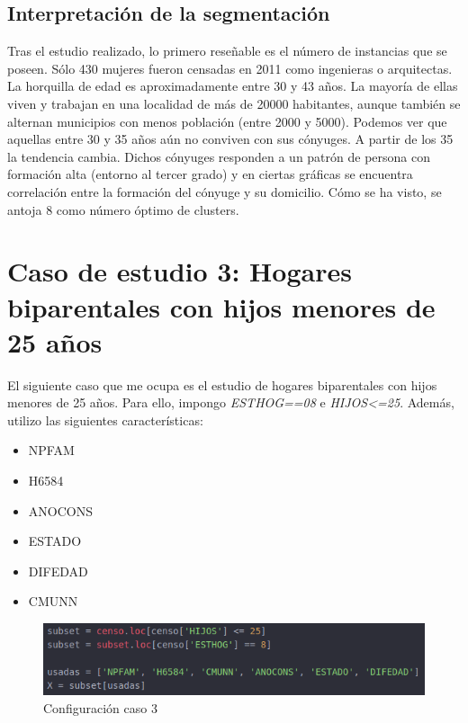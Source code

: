 \subsection{Interpretación de la segmentación}

Tras el estudio realizado, lo primero reseñable es el número de instancias que se poseen. Sólo 430 mujeres fueron censadas en 2011 como ingenieras o arquitectas. La horquilla de edad es aproximadamente entre 30 y 43 años. La mayoría de ellas viven y trabajan en una localidad de más de 20000 habitantes, aunque también se alternan municipios con menos población (entre 2000 y 5000). Podemos ver que aquellas entre 30 y 35 años aún no conviven con sus cónyuges. A partir de los 35 la tendencia cambia. Dichos cónyuges responden a un patrón de persona con formación alta (entorno al tercer grado) y en ciertas gráficas se encuentra correlación entre la formación del cónyuge y su domicilio. Cómo se ha visto, se antoja 8 como número óptimo de clusters. 

\newpage

\section{Caso de estudio 3: Hogares biparentales con hijos menores de 25 años}

El siguiente caso que me ocupa es el estudio de hogares biparentales con hijos menores de 25 años. Para ello, impongo \textit{ESTHOG==08} e \textit{HIJOS<=25}. Además, utilizo las siguientes características:

\begin{itemize}
	\item NPFAM
	\item H6584
	\item ANOCONS
	\item ESTADO
	\item DIFEDAD
	\item CMUNN
\end{itemize}

\begin{figure}[H] %
	\centering
	\includegraphics[scale=0.4]{capt4.png}  %
	\caption{Configuración caso 3} 
	\label{fig:conf-caso3}
\end{figure}


